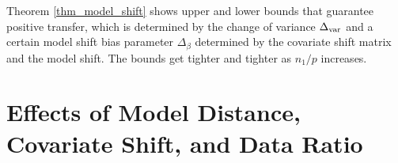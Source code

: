 Theorem \ref{thm_model_shift} shows upper and lower bounds that guarantee positive transfer, which is determined by the change of variance $\Delta_{\text{var}}$ and a certain model shift bias parameter $\Delta_{\beta}$ determined by the covariate shift matrix and the model shift.
The bounds get tighter and tighter as $n_1 / p$ increases.
%




\section{Effects of Model Distance, Covariate Shift, and Data Ratio}

